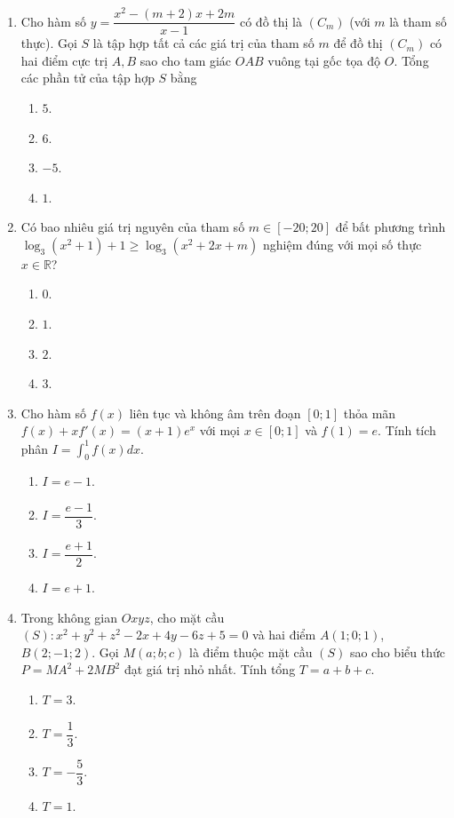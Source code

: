 \documentclass[12pt,a4paper]{article}
\begin{document}
\begin{enumerate}[label=\textbf{Câu \arabic*:}, leftmargin=*]

\item Cho hàm số $y = \dfrac{x^2 - (m+2)x + 2m}{x - 1}$ có đồ thị là $(C_m)$ (với $m$ là tham số thực). Gọi $S$ là tập hợp tất cả các giá trị của tham số $m$ để đồ thị $(C_m)$ có hai điểm cực trị $A, B$ sao cho tam giác $OAB$ vuông tại gốc tọa độ $O$. Tổng các phần tử của tập hợp $S$ bằng
\begin{enumerate}[label=\Alph*.]
    \item $5$.
    \item $6$.
    \item $-5$.
    \item $1$.
\end{enumerate}

\item Có bao nhiêu giá trị nguyên của tham số $m \in [-20; 20]$ để bất phương trình $\log_3(x^2 + 1) + 1 \ge \log_3(x^2 + 2x + m)$ nghiệm đúng với mọi số thực $x \in \mathbb{R}$?
\begin{enumerate}[label=\Alph*.]
    \item $0$.
    \item $1$.
    \item $2$.
    \item $3$.
\end{enumerate}

\item Cho hàm số $f(x)$ liên tục và không âm trên đoạn $[0; 1]$ thỏa mãn $f(x) + x f'(x) = (x + 1)e^x$ với mọi $x \in [0; 1]$ và $f(1) = e$. Tính tích phân $I = \int_0^1 f(x) dx$.
\begin{enumerate}[label=\Alph*.]
    \item $I = e - 1$.
    \item $I = \dfrac{e - 1}{3}$.
    \item $I = \dfrac{e + 1}{2}$.
    \item $I = e + 1$.
\end{enumerate}

\item Trong không gian $Oxyz$, cho mặt cầu $(S): x^2 + y^2 + z^2 - 2x + 4y - 6z + 5 = 0$ và hai điểm $A(1; 0; 1)$, $B(2; -1; 2)$. Gọi $M(a; b; c)$ là điểm thuộc mặt cầu $(S)$ sao cho biểu thức $P = MA^2 + 2MB^2$ đạt giá trị nhỏ nhất. Tính tổng $T = a + b + c$.
\begin{enumerate}[label=\Alph*.]
    \item $T = 3$.
    \item $T = \dfrac{1}{3}$.
    \item $T = -\dfrac{5}{3}$.
    \item $T = 1$.
\end{enumerate}


\end{enumerate}
\end{document}
